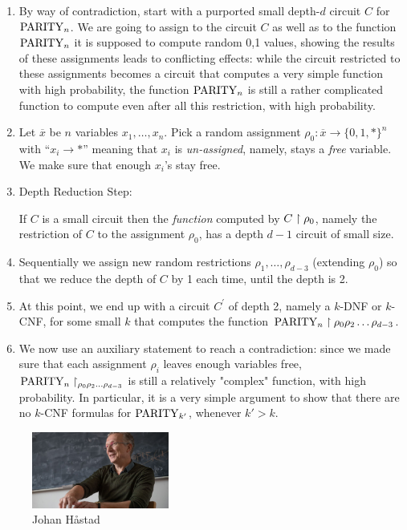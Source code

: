 \begin{enumerate}
\item By  way of contradiction, start with a purported small depth-$d$ circuit $C$ for $\operatorname{PARITY}_n$.
We are going to assign to the circuit $C$ as well as to the function $\operatorname{PARITY}_n$ it is supposed to compute random 0,1 values, showing the results of these assignments leads to conflicting effects: while the circuit restricted to these assignments becomes a circuit that computes a very simple function with high probability, the function $\operatorname{PARITY}_n$ is still a rather complicated function to compute even after all this restriction, with high probability.
\item Let $\overline x$ be $n$ variables $x_1,\dots,x_n$. Pick a random assignment $\rho_0: \overline x \rightarrow\{0,1, *\}^n$ with ``$x_i \rightarrow *$'' meaning that $x_i$ is \emph{un-assigned}, namely, stays a \emph{free} variable. We make sure that enough $x_i$'s stay  free.

\item Depth Reduction Step: 

If $C$ is a small circuit then the \emph{function} computed by $C\upharpoonright\rho_0$, namely the restriction of $C$ to the assignment $\rho_0$, has a depth  $d-1$ circuit of small size. 

\item
Sequentially we assign new random restrictions $\rho_1,\dots,\rho_{d-3}$
 (extending $\rho_0$) so that we reduce the depth of $C$ by 1 each time, until the depth is 2.

\item 
At this point, we end up with a circuit $C^{\prime}$ of depth 2, namely a $k$-DNF or $k$-CNF, for some small $k$ that computes the function 
$\operatorname{PARITY}_n\upharpoonright\rho_0\rho_2\ldots\rho_{d-3}$.

\item
We now use an auxiliary statement to reach a contradiction: since we made sure that each assignment $\rho_i$ leaves enough variables free, $\operatorname{PARITY}_n\upharpoonright_{\rho_0\rho_2\ldots\rho_{d-3}}$
is still a relatively "complex" function, with high probability. 
In particular, it is a very simple argument to show that there are no $k$-CNF formulas for $\operatorname{PARITY}_{k'}$, whenever $k'>k$.
\end{enumerate}


\begin{figure}
    \centering
    \includegraphics[width=0.4\textwidth]{images/hastad-sitter-600.jpg}
    \caption{Johan H\aa stad}
\end{figure}


